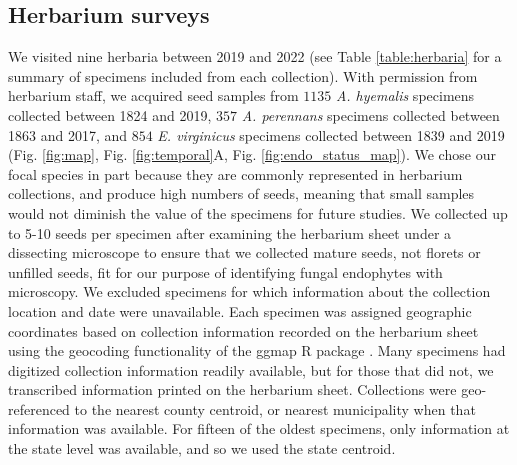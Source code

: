 \documentclass[11pt]{article}
\begin{document}
		\subsection*{Herbarium surveys}
We visited nine herbaria between 2019 and 2022 (see Table \ref{table:herbaria} for a summary of specimens included from each collection). 
With permission from herbarium staff, we acquired seed samples from $1135$ \emph{A. hyemalis} specimens collected between 1824 and 2019, $357$ \emph{A. perennans} specimens collected between 1863 and 2017, and $854$ \emph{E. virginicus} specimens collected between 1839 and 2019 (Fig. \ref{fig:map}, Fig. \ref{fig:temporal}A, Fig. \ref{fig:endo_status_map}).
We chose our focal species in part because they are commonly represented in herbarium collections, and produce high numbers of seeds, meaning that small samples would not diminish the value of the specimens for future studies. 
We collected up to 5-10 seeds per specimen after examining the herbarium sheet under a dissecting microscope to ensure that we collected mature seeds, not florets or unfilled seeds, fit for our purpose of identifying fungal endophytes with microscopy.
We excluded specimens for which information about the collection location and date were unavailable.
Each specimen was assigned geographic coordinates based on collection information recorded on the herbarium sheet using the geocoding functionality of the ggmap R package \citep{kahle2019package}.
Many specimens had digitized collection information readily available, but for those that did not, we transcribed information printed on the herbarium sheet. 
Collections were geo-referenced to the nearest county centroid, or nearest municipality when that information was available. 
For fifteen of the oldest specimens, only information at the state level was available, and so we used the state centroid.
\end{document}
